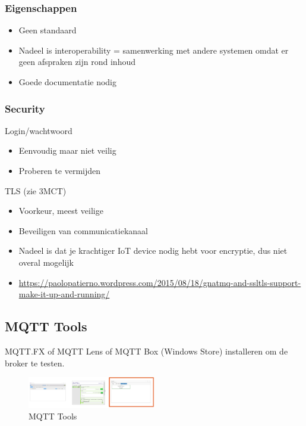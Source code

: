 \documentclass{article}
\begin{document}
\subsubsection{Eigenschappen}

\begin{itemize}
    \item Geen standaard
    \item Nadeel is interoperability = samenwerking met andere systemen omdat er geen afspraken zijn rond inhoud
    \item Goede documentatie nodig
\end{itemize}

\subsubsection{Security}

Login/wachtwoord

\begin{itemize}
    \item Eenvoudig maar niet veilig
    \item Proberen te vermijden
\end{itemize}

TLS (zie 3MCT)
\begin{itemize}
    \item Voorkeur, meest veilige
    \item Beveiligen van communicatiekanaal
    \item Nadeel is dat je krachtiger IoT device nodig hebt voor encryptie, dus niet overal mogelijk
    \item \url{https://paolopatierno.wordpress.com/2015/08/18/gnatmq-and-ssltls-support-make-it-up-and-running/}
\end{itemize}

\subsection{MQTT Tools}

MQTT.FX of MQTT Lens of MQTT Box (Windows Store) installeren om de broker te testen.

\begin{figure}[H]
    \centering
    \includegraphics[width=0.5\textwidth]{mqtt-tools.png}
    \caption{MQTT Tools}
\end{figure}
\end{document}
